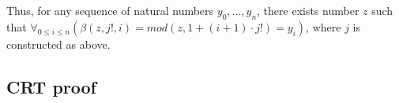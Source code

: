 \documentclass{article}
\begin{document}
Thus, for any sequence of natural numbers $y_0, ..., y_n$, there exists number $z$
such that $\forall_{0 \leqslant i \leqslant n}(\beta(z, j!, i) = mod(z, 1 + (i + 1) \cdot j!) = y_i)$,
where $j$ is constructed as above.

\subsection{CRT proof}



\end{document}
